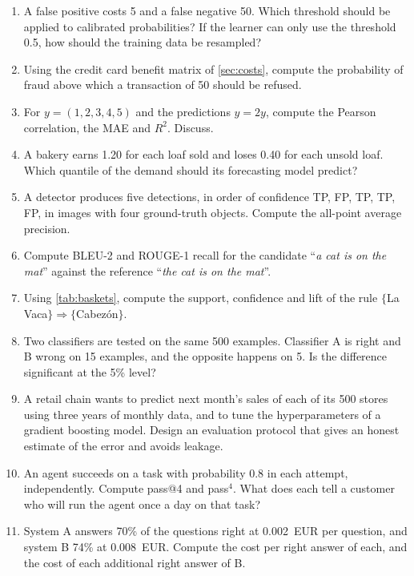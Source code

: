 \begin{enumerate}[label=\textbf{1.\arabic*},ref=1.\arabic*,leftmargin=*,itemsep=6pt]
        (\cref{eq:murphy}). Check that they add up to the Brier score.
  \item\label{exr:cost} A false positive costs 5\EUR{} and a false negative 50\EUR. Which
        threshold should be applied to calibrated probabilities? If the learner can only use
        the threshold 0.5, how should the training data be resampled?
  \item\label{exr:fraud} Using the credit card benefit matrix of \cref{sec:costs}, compute the
        probability of fraud above which a transaction of 50\EUR{} should be refused.
  \item\label{exr:corr} For $y=(1,2,3,4,5)$ and the predictions $\hat y=2y$, compute the Pearson
        correlation, the MAE and $R^2$. Discuss.
  \item\label{exr:bakery} A bakery earns 1.20\EUR{} for each loaf sold and loses 0.40\EUR{} for
        each unsold loaf. Which quantile of the demand should its forecasting model predict?
  \item\label{exr:ap} A detector produces five detections, in order of confidence TP, FP, TP,
        TP, FP, in images with four ground-truth objects. Compute the all-point average
        precision.
  \item\label{exr:bleu} Compute BLEU-2 and ROUGE-1 recall for the candidate ``\emph{a cat is on
        the mat}'' against the reference ``\emph{the cat is on the mat}''.
  \item\label{exr:rule} Using \cref{tab:baskets}, compute the support, confidence and lift of
        the rule $\{$La Vaca$\}\Rightarrow\{$Cabez\'on$\}$.
  \item\label{exr:mcnemar} Two classifiers are tested on the same 500 examples. Classifier A is
        right and B wrong on 15 examples, and the opposite happens on 5. Is the difference
        significant at the 5\% level?
  \item\label{exr:protocol} A retail chain wants to predict next month's sales of each of its
        500 stores using three years of monthly data, and to tune the hyperparameters of a
        gradient boosting model. Design an evaluation protocol that gives an honest estimate of
        the error and avoids leakage.
\item\label{exr:passk} An agent succeeds on a task with probability 0.8 in each attempt,
independently. Compute pass@4 and pass$^4$. What does each tell a customer who will run the agent
once a day on that task?
\item\label{exr:llmcost} System A answers 70\% of the questions right at 0.002~EUR per question, and
system B 74\% at 0.008~EUR. Compute the cost per right answer of each, and the cost of each
additional right answer of B.
\end{enumerate}


